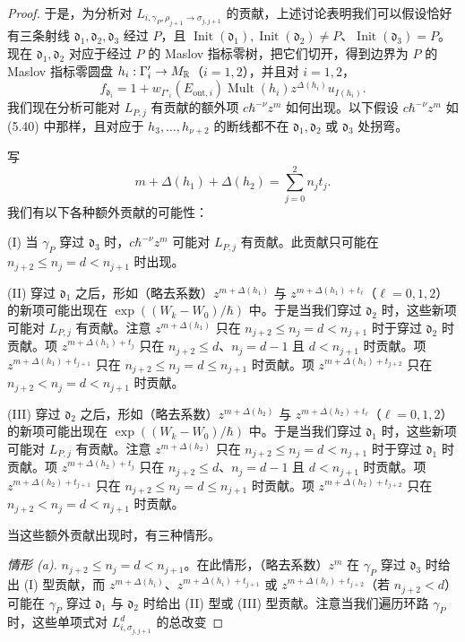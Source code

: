 \begin{proof}
于是，为分析对 $L_{i,\gamma_P,\rho_{j+1}\to\sigma_{j,j+1}}$ 的贡献，上述讨论表明我们可以假设恰好有三条射线 $\mathfrak d_1,\mathfrak d_2,\mathfrak d_3$ 经过 $P$，且 $\operatorname{Init}(\mathfrak d_1),\operatorname{Init}(\mathfrak d_2)\ne P$、$\operatorname{Init}(\mathfrak d_3)=P$。现在 $\mathfrak d_1,\mathfrak d_2$ 对应于经过 $P$ 的 Maslov 指标零树，把它们切开，得到边界为 $P$ 的 Maslov 指标零圆盘 $h_i:\Gamma'_i\to M_{\mathbb{R}}$（$i=1,2$），并且对 $i=1,2$，
\[
  f_{\mathfrak d_i}=1+w_{\Gamma'_i}(E_{\mathrm{out},i})\operatorname{Mult}(h_i)z^{\Delta(h_i)}u_{I(h_i)}.
\]
我们现在分析可能对 $L_{P,j}$ 有贡献的额外项 $c\hbar^{-\nu}z^m$ 如何出现。以下假设 $c\hbar^{-\nu}z^m$ 如 (5.40) 中那样，且对应于 $h_3,\ldots,h_{\nu+2}$ 的断线都不在 $\mathfrak d_1,\mathfrak d_2$ 或 $\mathfrak d_3$ 处拐弯。

写
\[
  m+\Delta(h_1)+\Delta(h_2)=\sum_{j=0}^{2}n_jt_j.
\]
我们有以下各种额外贡献的可能性：

(I) 当 $\gamma_P$ 穿过 $\mathfrak d_3$ 时，$c\hbar^{-\nu}z^m$ 可能对 $L_{P,j}$ 有贡献。此贡献只可能在 $n_{j+2}\le n_j=d<n_{j+1}$ 时出现。

(II) 穿过 $\mathfrak d_1$ 之后，形如（略去系数）$z^{m+\Delta(h_1)}$ 与 $z^{m+\Delta(h_1)+t_\ell}$（$\ell=0,1,2$）的新项可能出现在 $\exp((W_k-W_0)/\hbar)$ 中。于是当我们穿过 $\mathfrak d_2$ 时，这些新项可能对 $L_{P,j}$ 有贡献。注意 $z^{m+\Delta(h_1)}$ 只在 $n_{j+2}\le n_j=d<n_{j+1}$ 时于穿过 $\mathfrak d_2$ 时贡献。项 $z^{m+\Delta(h_1)+t_j}$ 只在 $n_{j+2}\le d$、$n_j=d-1$ 且 $d<n_{j+1}$ 时贡献。项 $z^{m+\Delta(h_1)+t_{j+1}}$ 只在 $n_{j+2}\le n_j=d\le n_{j+1}$ 时贡献。项 $z^{m+\Delta(h_1)+t_{j+2}}$ 只在 $n_{j+2}<n_j=d<n_{j+1}$ 时贡献。

(III) 穿过 $\mathfrak d_2$ 之后，形如（略去系数）$z^{m+\Delta(h_2)}$ 与 $z^{m+\Delta(h_2)+t_\ell}$（$\ell=0,1,2$）的新项可能出现在 $\exp((W_k-W_0)/\hbar)$ 中。于是当我们穿过 $\mathfrak d_1$ 时，这些新项可能对 $L_{P,j}$ 有贡献。注意 $z^{m+\Delta(h_2)}$ 只在 $n_{j+2}\le n_j=d<n_{j+1}$ 时于穿过 $\mathfrak d_1$ 时贡献。项 $z^{m+\Delta(h_2)+t_j}$ 只在 $n_{j+2}\le d$、$n_j=d-1$ 且 $d<n_{j+1}$ 时贡献。项 $z^{m+\Delta(h_2)+t_{j+1}}$ 只在 $n_{j+2}\le n_j=d\le n_{j+1}$ 时贡献。项 $z^{m+\Delta(h_2)+t_{j+2}}$ 只在 $n_{j+2}<n_j=d<n_{j+1}$ 时贡献。

当这些额外贡献出现时，有三种情形。

\textit{情形 (a).} $n_{j+2}\le n_j=d<n_{j+1}$。在此情形，（略去系数）$z^m$ 在 $\gamma_P$ 穿过 $\mathfrak d_3$ 时给出 (I) 型贡献，而 $z^{m+\Delta(h_i)}$、$z^{m+\Delta(h_i)+t_{j+1}}$ 或 $z^{m+\Delta(h_i)+t_{j+2}}$（若 $n_{j+2}<d$）可能在 $\gamma_P$ 穿过 $\mathfrak d_1$ 与 $\mathfrak d_2$ 时给出 (II) 型或 (III) 型贡献。注意当我们遍历环路 $\gamma_P$ 时，这些单项式对 $L^d_{i,\sigma_{j,j+1}}$ 的总改变


\end{proof}
